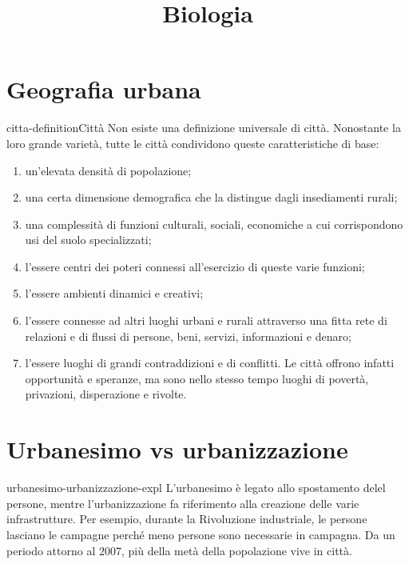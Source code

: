 \documentclass[preview]{standalone}
\begin{document}
\title{Biologia}
\genpage

\section{Geografia urbana}

\begin{snippetdefinition}{citta-definition}{Città}
    Non esiste una definizione universale di città.
    Nonostante la loro grande varietà, tutte le città condividono queste
    caratteristiche di base:
    \begin{enumerate}
        \item un'elevata densità di popolazione;
        \item una certa dimensione demografica che la distingue dagli
        insediamenti rurali;
        \item una complessità di funzioni culturali, sociali, economiche a cui
        corrispondono usi del suolo specializzati;
        \item l'essere centri dei poteri connessi all'esercizio di queste varie
        funzioni;
        \item l'essere ambienti dinamici e creativi;
        \item l'essere connesse ad altri luoghi urbani e rurali attraverso una
        fitta rete di relazioni e di flussi di persone, beni, servizi,
        informazioni e denaro;
        \item l'essere luoghi di grandi contraddizioni e di conflitti. Le città
        offrono infatti opportunità e speranze, ma sono nello stesso
        tempo luoghi di povertà, privazioni, disperazione e rivolte.
    \end{enumerate}
\end{snippetdefinition}

\section{Urbanesimo vs urbanizzazione}

\begin{snippet}{urbanesimo-urbanizzazione-expl}
    L'urbanesimo è legato allo spostamento delel persone,
    mentre l'urbanizzazione fa riferimento alla creazione delle varie infrastrutture.
    Per esempio, durante la Rivoluzione industriale, le persone lasciano le campagne
    perché meno persone sono necessarie in campagna.
    Da un periodo attorno al 2007, più della metà della popolazione vive in città.
\end{snippet}
\end{document}
